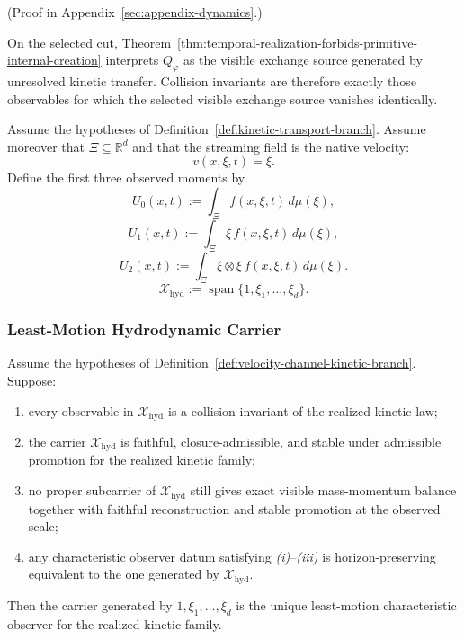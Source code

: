 (Proof in Appendix~\ref{sec:appendix-dynamics}.)

On the selected cut,
Theorem~\ref{thm:temporal-realization-forbids-primitive-internal-creation}
interprets \(Q_\varphi\) as the visible exchange source generated by
unresolved kinetic transfer. Collision invariants are
therefore exactly those observables for which the selected visible exchange
source vanishes identically.

\begin{definition}
\label{def:velocity-channel-kinetic-branch}
Assume the hypotheses of Definition~\ref{def:kinetic-transport-branch}.
Assume moreover that \(\Xi\subseteq \mathbb R^d\) and that the streaming field
is the native velocity:
\[
v(x,\xi,t)=\xi.
\]
Define the first three observed moments by
\[
U_0(x,t):=\int_\Xi f(x,\xi,t)\,d\mu(\xi),
\]
\[
U_1(x,t):=\int_\Xi \xi\,f(x,\xi,t)\,d\mu(\xi),
\]
\[
U_2(x,t):=\int_\Xi \xi\otimes \xi\,f(x,\xi,t)\,d\mu(\xi).
\]
\[
\mathcal X_{\mathrm{hyd}}
:=
\operatorname{span}\{1,\xi_1,\dots,\xi_d\}.
\]
\end{definition}

\subsubsection{Least-Motion Hydrodynamic Carrier}

\begin{theorem}
\label{thm:least-motion-hydrodynamic-observer}
Assume the hypotheses of Definition~\ref{def:velocity-channel-kinetic-branch}.
Suppose:
\begin{enumerate}[label=(\roman*),itemsep=0.2em]
\item every observable in \(\mathcal X_{\mathrm{hyd}}\) is a collision
      invariant of the realized kinetic law;
\item the carrier \(\mathcal X_{\mathrm{hyd}}\) is faithful,
      closure-admissible, and stable under admissible promotion for the
      realized kinetic family;
\item no proper subcarrier of \(\mathcal X_{\mathrm{hyd}}\) still gives exact
      visible mass-momentum balance together with faithful reconstruction and
      stable promotion at the observed scale;
\item any characteristic observer datum satisfying \emph{(i)}--\emph{(iii)} is
      horizon-preserving equivalent to the one generated by
      \(\mathcal X_{\mathrm{hyd}}\).
\end{enumerate}
Then the carrier generated by \(1,\xi_1,\dots,\xi_d\) is the unique
least-motion characteristic observer for the realized kinetic family.
\end{theorem}

